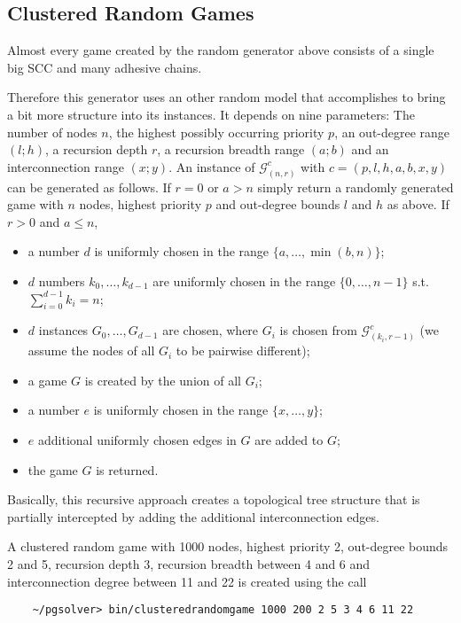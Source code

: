 \subsection{Clustered Random Games}

Almost every game created by the random generator above consists of a single big SCC and many adhesive
chains.

Therefore this generator uses an other random model that accomplishes to bring a bit more structure into its instances. It depends on nine parameters: The number of nodes $n$, the highest possibly occurring priority $p$, an out-degree range $(l;h)$, a recursion depth $r$, a recursion breadth range $(a;b)$ and an interconnection range $(x;y)$. An instance of $\mathcal{G}^c_{(n,r)}$ with $c = (p,l,h,a,b,x,y)$ can be generated as follows. If $r = 0$ or $a > n$ simply return a randomly generated game with $n$ nodes, highest priority $p$ and out-degree bounds $l$ and $h$ as above. If $r > 0$ and $a \leq n$,
\begin{itemize}
\item a number $d$ is uniformly chosen in the range $\{a,\ldots,\min(b,n)\}$;
\item $d$ numbers $k_0,\ldots,k_{d-1}$ are uniformly chosen in the range $\{0,\ldots,n-1\}$ s.t.\ $\sum_{i=0}^{d-1} k_i = n$;
\item $d$ instances $G_0,\ldots,G_{d-1}$ are chosen, where $G_i$ is chosen from $\mathcal{G}^c_{(k_i,r-1)}$ (we assume the nodes of all $G_i$ to be pairwise different);
\item a game $G$ is created by the union of all $G_i$;
\item a number $e$ is uniformly chosen in the range $\{x,\ldots,y\}$;
\item $e$ additional uniformly chosen edges in $G$ are added to $G$;
\item the game $G$ is returned.
\end{itemize}

Basically, this recursive approach creates a topological tree structure that is partially intercepted by adding the additional interconnection edges.

A clustered random game with 1000 nodes, highest priority 2, out-degree bounds 2 and 5, recursion depth 3, recursion breadth between 4 and 6 and interconnection degree between 11 and 22 is created using the call
\begin{verbatim}
    ~/pgsolver> bin/clusteredrandomgame 1000 200 2 5 3 4 6 11 22
\end{verbatim}


